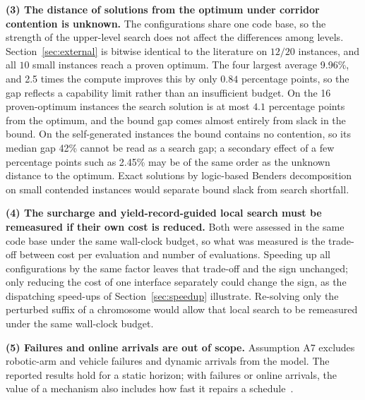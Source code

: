 \documentclass[manuscript,screen,review]{acmart}
\newcommand{\GainProbeLoop}{2.45\%}      %
\newcommand{\LBGapMed}{42\%}
\newcommand{\PubNInst}{20}
\newcommand{\PubNOpt}{16}                 %
\newcommand{\PubNMatch}{12}               %
\newcommand{\PubGapBig}{9.96\%}           %
\newcommand{\PubBudgetRatio}{2.5}
\newcommand{\PubBudgetGainPP}{0.84}       %
\newcommand{\PubLBResidMax}{4.1}          %
\begin{document}
\textbf{(3) The distance of solutions from the optimum under corridor contention is unknown.}
The configurations share one code base, so the strength of the upper-level search does not affect the differences among levels.
Section~\ref{sec:external} is bitwise identical to the literature on $\PubNMatch{}/\PubNInst{}$ instances, and all $10$ small instances reach a proven optimum.
The four largest average \PubGapBig{}, and \PubBudgetRatio{} times the compute improves this by only $\PubBudgetGainPP$ percentage points, so the gap reflects a capability limit rather than an insufficient budget.
On the \PubNOpt{} proven-optimum instances the search solution is at most $\PubLBResidMax$ percentage points from the optimum, and the bound gap comes almost entirely from slack in the bound.
On the self-generated instances the bound contains no contention, so its median gap \LBGapMed{} cannot be read as a search gap; a secondary effect of a few percentage points such as \GainProbeLoop{} may be of the same order as the unknown distance to the optimum.
Exact solutions by logic-based Benders decomposition~\cite{vanos2026exact} on small contended instances would separate bound slack from search shortfall.

\textbf{(4) The surcharge and yield-record-guided local search must be remeasured if their own cost is reduced.}
Both were assessed in the same code base under the same wall-clock budget, so what was measured is the trade-off between cost per evaluation and number of evaluations.
Speeding up all configurations by the same factor leaves that trade-off and the sign unchanged; only reducing the cost of one interface separately could change the sign, as the dispatching speed-ups of Section~\ref{sec:speedup} illustrate.
Re-solving only the perturbed suffix of a chromosome would allow that local search to be remeasured under the same wall-clock budget.

\textbf{(5) Failures and online arrivals are out of scope.}
Assumption A7 excludes robotic-arm and vehicle failures and dynamic arrivals from the model.
The reported results hold for a static horizon; with failures or online arrivals, the value of a mechanism also includes how fast it repairs a schedule~\cite{gui2023dynamic,xiong2024dynamic,dauzereperes2024fjsp}.







\end{document}
